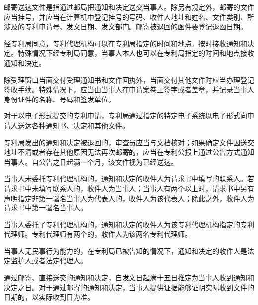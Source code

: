 邮寄送达文件是指通过邮局把通知和决定送交当事人。除另有规定外，邮寄的文件应当挂号，并应当在计算机中登记挂号的号码、收件人地址和姓名、文件类别、所涉及的专利申请号、发文日期、发文部门。邮寄被退回的函件要登记退函日期。

经专利局同意，专利代理机构可以在专利局指定的时间和地点，按时接收通知和决定。特殊情况下经专利局同意，当事人本人也可以在专利局指定的时间和地点接收通知和决定。

除受理窗口当面交付受理通知书和文件回执外，当面交付其他文件时应当办理登记签收手续。特殊情况下，应当由当事人在申请案卷上签字或者盖章，并记录当事人身份证件的名称、号码和签发单位。

对于以电子形式提交的专利申请，专利局通过指定的特定电子系统以电子形式向申请人送达各种通知书、决定和其他文件。

专利局发出的通知和决定被退回的，审查员应当与文档核对；如果确定文件因送交地址不清或者存在其他原因无法再次邮寄的，应当在专利公报上通过公告方式通知当事人。自公告之日起满一个月，该文件视为已经送达。

当事人未委托专利代理机构的，通知和决定的收件人为请求书中填写的联系人。若请求书中未填写联系人的，收件人为当事人；当事人有两个以上时，请求书中另有声明指定非第一署名当事人为代表人的，收件人为该代表人；除此之外，收件人为请求书中第一署名当事人。

当事人委托了专利代理机构的，通知和决定的收件人为该专利代理机构指定的专利代理师。专利代理师有两个的，收件人为该两名专利代理师。

当事人无民事行为能力的，在专利局已被告知的情况下，通知和决定的收件人是法定监护人或者法定代理人。

通过邮寄、直接送交的通知和决定，自发文日起满十五日推定为当事人收到通知和决定之日。对于通过邮寄的通知和决定，当事人提供证据能够证明实际收到文件的日期的，以实际收到日为准。

